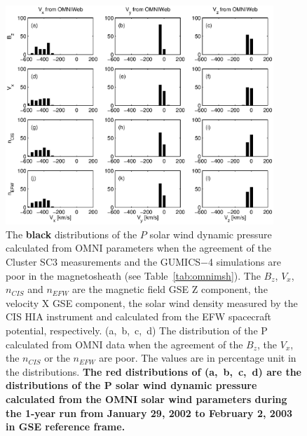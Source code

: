 \documentclass[linenumbers,draft]{agujournal}
\begin{document}
\begin{figure}[h]
\centering
\includegraphics[width=0.9\textwidth,angle=0]{swe-2020-corr-f18}
\caption{The \textbf{black} distributions of the $P$ solar wind dynamic pressure calculated from OMNI parameters when the agreement of the Cluster SC3 measurements and the GUMICS$-$4 simulations are poor in the magnetosheath (see Table~\ref{tab:omnimsh}). The $B_{z}$, $V_{x}$, $n_{CIS}$ and $n_{EFW}$ are the magnetic field GSE Z component, the velocity X GSE component, the solar wind density measured by the CIS HIA instrument and calculated from the EFW spacecraft potential, respectively. (a,~b,~c,~d) The distribution of the P calculated from OMNI data when the agreement of the $B_{z}$, the $V_{x}$, the $n_{CIS}$ or the $n_{EFW}$ are poor. The values are in percentage unit in the distributions. \textbf{The red distributions of (a,~b,~c,~d) are the distributions of the P solar wind dynamic pressure calculated from the OMNI solar wind parameters during the 1-year run from January 29, 2002 to February 2, 2003 in GSE reference frame.}}
\label{fig:mshomnip}
\end{figure}

\pagebreak
\end{document}
